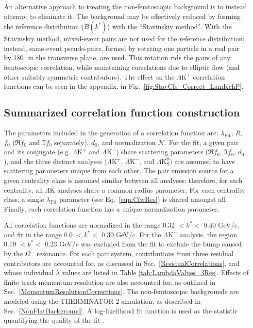 \documentclass[ALICE,manyauthors]{cernphprep}
\newcommand{\LamK}{$\Lambda$K\xspace}
\newcommand{\LamKchP}{$\Lambda\mathrm{K^{+}}$\xspace}
\newcommand{\ALamKchM}{$\overline{\Lambda}\mathrm{K^{-}}$\xspace}
\newcommand{\LamKchM}{$\Lambda\mathrm{K^{-}}$\xspace}
\newcommand{\LamKs}{$\Lambda\mathrm{K^{0}_{S}}$\xspace}
\begin{document}
An alternative approach to treating the non-femtoscopic background is to instead attempt to eliminate it.
The background may be effectively reduced by forming the reference distribution ($B(k^{*})$) with the ``Stavinskiy method".
With the Stavinskiy method, mixed-event pairs are not used for the reference distribution; instead, same-event pseudo-pairs, formed by rotating one particle in a real pair by 180$^\circ$ in the transverse plane, are used.  
This rotation rids the pairs of any femtoscopic correlation, while maintaining correlations due to elliptic flow (and other suitably symmetric contributors).
The effect on the \LamKchP correlation functions can be seen in the appendix, in Fig.\ \ref{fig:StavCfs_Correct_LamKchP}.


\subsection{Summarized correlation function construction}
\label{SummarizedFitProcedure}

The parameters included in the generation of a correlation function are: $\lambda_{\mathrm{Fit}}$, $R$, $f_{0}$ ($\Re f_{0}$ and $\Im f_{0}$ separately), $d_{0}$, and normalization $\mathcal{N}$.
For the fit, a given pair and its conjugate (e.g. \LamKchP and \ALamKchM) share scattering parameters ($\Re f_{0}$, $\Im f_{0}$, $d_{0}$), and the three distinct analyses (\LamKchP, \LamKchM, and \LamKs) are assumed to have scattering parameters unique from each other.
The pair emission source for a given centrality class is assumed similar between all analyses; therefore, for each centrality, all \LamK analyses share a common radius parameter.
For each centrality class, a single $\lambda_{\mathrm{Fit}}$ parameter (see Eq.\ \ref{eqn:CfwRes}) is shared amongst all.
Finally, each correlation function has a unique normalization parameter.

All correlation functions are normalized in the range 0.32 $< k^{*} <$ 0.40 GeV/$c$, and fit in the range 0.0 $< k^{*} <$ 0.30 GeV/$c$.
For the \LamKchM analysis, the region 0.19 $< k^{*} <$ 0.23 GeV/$c$ was excluded from the fit to exclude the bump caused by the $\Omega^{-}$ resonance.
For each pair system, contributions from three residual contributors are accounted for, as discussed in Sec.\ \ref{ResidualCorrelations}, and whose individual $\lambda$ values are listed in Table \ref{tab:LambdaValues_3Res}.
Effects of finite track momentum resolution are also accounted for, as outlined in Sec.\ \ref{MomentumResolutionCorrections}.
The non-femtoscopic backgrounds are modeled using the THERMINATOR 2 simulation, as described in Sec.\ \ref{NonFlatBackground}.
A log-likelihood fit function is used as the statistic quantifying the quality of the fit \cite{Lisa:2005dd}.
\end{document}
